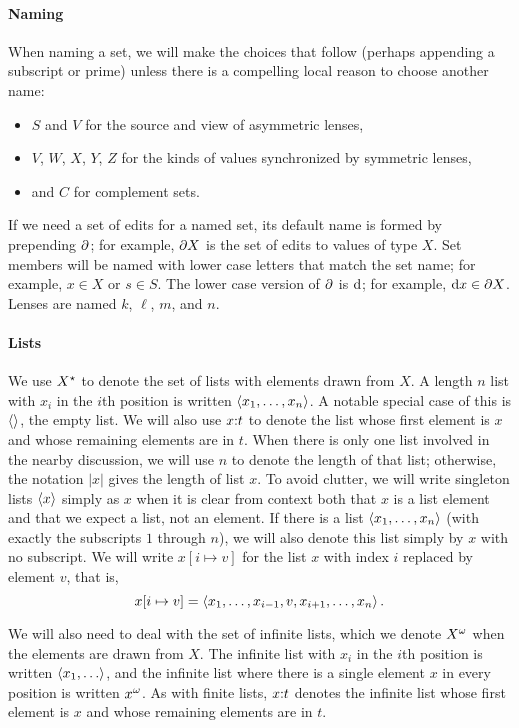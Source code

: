 \paragraph*{Naming}
When naming a set, we will make the choices that follow (perhaps appending a
subscript or prime) unless there is a compelling local reason to choose
another name:
\begin{itemize}
    \item $S$ and $V$ for the source and view of asymmetric lenses,
    \item $V$, $W$, $X$, $Y$, $Z$ for the kinds of values synchronized by
        symmetric lenses,
    \item and $C$ for complement sets.
\end{itemize}
If we need a set of edits for a named set, its default name is formed by
prepending $\partial$; for example, $\partial X$ is the set of edits to values of type
$X$. Set members will be named with lower case letters that match the set
name; for example, $x \in X$ or $s \in S$. The lower case version of $\partial$ is
$\textrm{d}$; for example, $\textrm{d} x \in \partial X$. Lenses are named $k$, $\ell$, $m$, and
$n$.

\paragraph*{Lists}
We use $X^\star$ to denote the set of lists with elements drawn from $X$. A
length $n$ list with $x_i$ in the $i$th position is written $\left< x_1
,\ldots, x_n \right>$. A notable special case of this is $\left<\right>$, the empty
list. We will also use $x \mathord{:} t$ to denote the list whose first element
is $x$ and whose remaining elements are in $t$. When there is only one list
involved in the nearby discussion, we will use $n$ to denote the length of
that list; otherwise, the notation $|x|$ gives the length of list $x$. To
avoid clutter, we will write singleton lists $\left< x \right>$ simply as $x$
when it is clear from context both that $x$ is a list element and that we
expect a list, not an element. If there is a list $\left< x_1 ,\ldots, x_n
\right>$ (with exactly the subscripts $1$ through $n$), we will also denote
this list simply by $x$ with no subscript. We will write $x[i \mapsto v]$
for the list $x$ with index $i$ replaced by element $v$, that is,
\[x[i \mapsto v] = \left< x_1 ,\ldots, x_{i-1} , v , x_{i+1} ,\ldots,
x_n \right>.\]

We will also need to deal with the set of infinite lists, which we denote
$X^\omega$ when the elements are drawn from $X$. The infinite list with $x_i$
in the $i$th position is written $\left< x_1 ,\ldots\right>$, and the infinite list
where there is a single element $x$ in every position is written $x^\omega$.
As with finite lists, $x \mathord{:} t$ denotes the infinite list whose first
element is $x$ and whose remaining elements are in $t$.

